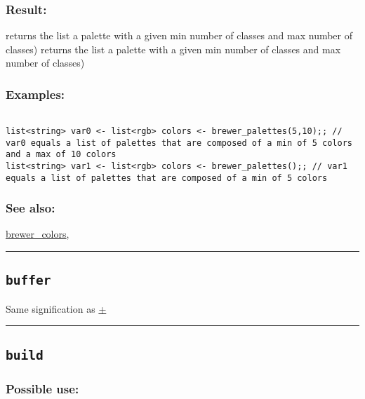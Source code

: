 \documentclass[]{book}
\theoremstyle{definition}
\theoremstyle{definition}
\theoremstyle{definition}
\theoremstyle{remark}
\begin{document}
\subsubsection{Result:}\label{result-77}

returns the list a palette with a given min number of classes and max
number of classes) returns the list a palette with a given min number of
classes and max number of classes)

\subsubsection{Examples:}\label{examples-60}

\begin{verbatim}
 
list<string> var0 <- list<rgb> colors <- brewer_palettes(5,10);; // var0 equals a list of palettes that are composed of a min of 5 colors and a max of 10 colors 
list<string> var1 <- list<rgb> colors <- brewer_palettes();; // var1 equals a list of palettes that are composed of a min of 5 colors
\end{verbatim}

\subsubsection{See also:}\label{see-also-49}

\href{OperatorsBC\#brewer_colors}{brewer\_colors},

\begin{center}\rule{0.5\linewidth}{\linethickness}\end{center}

\subsection{\texorpdfstring{\texttt{buffer}}{buffer}}\label{buffer}

Same signification as \href{OperatorsAA\#+}{+}

\begin{center}\rule{0.5\linewidth}{\linethickness}\end{center}

\subsection{\texorpdfstring{\texttt{build}}{build}}\label{build}

\subsubsection{Possible use:}\label{possible-use-79}
\end{document}
